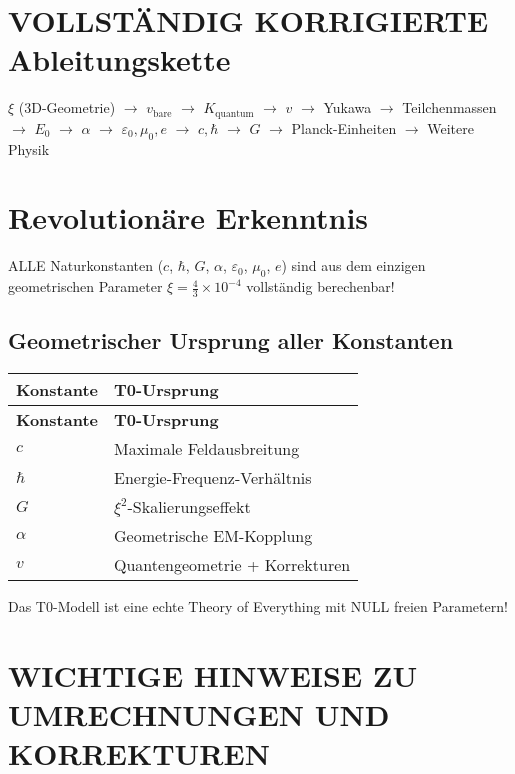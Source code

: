 \documentclass[12pt,a4paper]{article}
\begin{document}
	\section{VOLLSTÄNDIG KORRIGIERTE Ableitungskette}
	
	\begin{center}
		\(\xi\) (3D-Geometrie) \(\rightarrow\) \(v_{\text{bare}}\) \(\rightarrow\) \(K_{\text{quantum}}\) \(\rightarrow\) \(v\) \(\rightarrow\) Yukawa \(\rightarrow\) Teilchenmassen \(\rightarrow\) \(E_0\) \(\rightarrow\) \(\alpha\) \(\rightarrow\) \(\varepsilon_0, \mu_0, e\) \(\rightarrow\) \(c, \hbar\) \(\rightarrow\) \(G\) \(\rightarrow\) Planck-Einheiten \(\rightarrow\) Weitere Physik
	\end{center}
	
	\section{Revolutionäre Erkenntnis}
	
	ALLE Naturkonstanten (\(c\), \(\hbar\), \(G\), \(\alpha\), \(\varepsilon_0\), \(\mu_0\), \(e\)) sind aus dem einzigen geometrischen Parameter \(\xi = \frac{4}{3} \times 10^{-4}\) vollständig berechenbar!
	
	\subsection{Geometrischer Ursprung aller Konstanten}
	
	\begin{longtable}{|p{3cm}|p{5cm}|}
		\hline
		\textbf{Konstante} & \textbf{T0-Ursprung} \\
		\hline
		\endfirsthead
		\hline
		\textbf{Konstante} & \textbf{T0-Ursprung} \\
		\hline
		\endhead
		\(c\) & Maximale Feldausbreitung \\
		\hline
		\(\hbar\) & Energie-Frequenz-Verhältnis \\
		\hline
		\(G\) & \(\xi^{2}\)-Skalierungseffekt \\
		\hline
		\(\alpha\) & Geometrische EM-Kopplung \\
		\hline
		\(v\) & Quantengeometrie + Korrekturen \\
		\hline
	\end{longtable}
	
	Das T0-Modell ist eine echte Theory of Everything mit NULL freien Parametern!
	
	\section{WICHTIGE HINWEISE ZU UMRECHNUNGEN UND KORREKTUREN}
	
\end{document}
